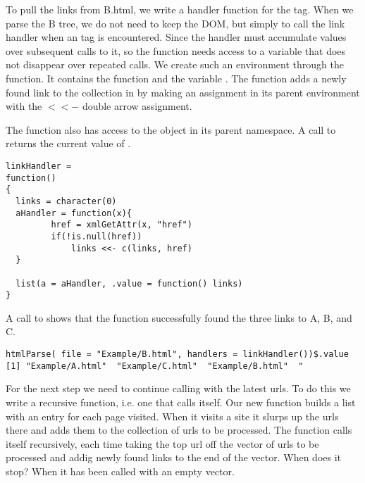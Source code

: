 To pull the links from B.html, we write a handler
function for the  tag.
When we parse the B tree, we do not need to keep 
the DOM, but simply to call the link handler when
an  tag is encountered.
Since the handler must accumulate  values over 
subsequent calls to it, so the function needs access to a variable 
that does not disappear over repeated calls. 
We create such an environment through the 
function.
It contains the  function and 
the variable .
The  function adds a newly found link
to the collection in  by making an
assignment in its parent environment with the $\lt\lt-$
double arrow assignment.

The  function also has access to the 
 object in its parent namespace. 
A call to  returns the current value of 
.

\small{
\begin{verbatim}
linkHandler =
function()
{
  links = character(0)
  aHandler = function(x){
         href = xmlGetAttr(x, "href")
         if(!is.null(href))
             links <<- c(links, href)
  }

  list(a = aHandler, .value = function() links)
}
\end{verbatim}
}

A call to  shows that the function
 successfully found the three links to 
A, B, and C.

\begin{verbatim}
htmlParse( file = "Example/B.html", handlers = linkHandler())$.value
[1] "Example/A.html"  "Example/C.html"  "Example/B.html"  "
\end{verbatim}
For the next step we need to continue calling 
 with the latest urls.
To do this we write a recursive function, i.e. one that calls itself.
Our new function  builds a list
with an entry for each page visited.
When it visits a site it slurps up the urls
there and adds them to the collection of urls to be processed.
The  function calls itself recursively,
each time taking the top url off the vector of urls to be processed
and addig newly found links to the end of the vector.
When does it stop?
When it has been called with an empty vector.

